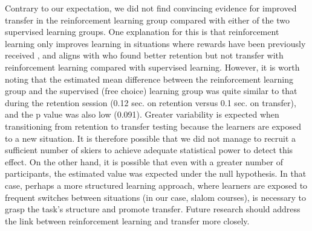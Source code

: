 \documentclass[pdflatex,sn-nature]{sn-jnl}%
\theoremstyle{thmstyleone}%
\theoremstyle{thmstyletwo}%
\theoremstyle{thmstylethree}%
\begin{document}
Contrary to our expectation, we did not find convincing evidence for improved transfer in the reinforcement learning group compared with either of the two supervised learning groups. One explanation for this is that reinforcement learning only improves learning in situations where rewards have been previously received \cite{robertson_memory_2018}, and aligns with \cite{hasson_reinforcement_2015} who found better retention but not transfer with reinforcement learning compared with supervised learning. However, it is worth noting that the estimated mean difference between the reinforcement learning group and the supervised (free choice) learning group was quite similar to that during the retention session (0.12 sec. on retention versus 0.1 sec. on transfer), and the p value was also low (0.091). Greater variability is expected when transitioning from retention to transfer testing because the learners are exposed to a new situation. It is therefore possible that we did not manage to recruit a sufficient number of skiers to achieve adequate statistical power to detect this effect. On the other hand, it is possible that even with a greater number of participants, the estimated value was expected under the null hypothesis. In that case, perhaps a more structured learning approach, where learners are exposed to frequent switches between situations (in our case, slalom courses), is necessary to grasp the task's structure and promote transfer\cite{braun_structure_2010}. Future research should address the link between reinforcement learning and transfer more closely. 
\end{document}
